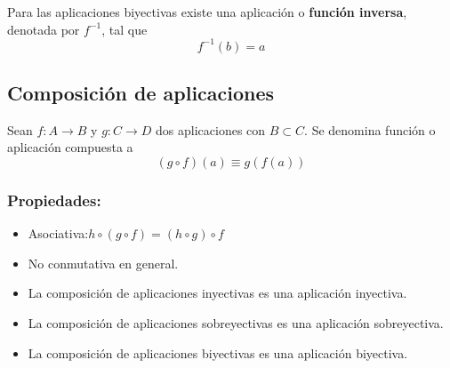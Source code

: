 \documentclass[0_algebra.tex]{subfiles}
\begin{document}
Para las aplicaciones biyectivas existe una aplicación o \textbf{función inversa}, denotada por $f^{-1}$, tal que
$$
f^{-1}(b)=a
$$

\subsection*{Composición de aplicaciones}
Sean $f:A\rightarrow B$ y $g:C \rightarrow D$ dos aplicaciones con $B \subset C$. Se denomina función o aplicación compuesta a
$$
(g\circ f)(a)\equiv g(f(a))
$$

\subsubsection*{Propiedades:}
\begin{itemize}
\item Asociativa:\quad $ h \circ (g \circ f)=(h \circ g) \circ f$
\item No conmutativa en general.
\item La composición de aplicaciones inyectivas es una aplicación inyectiva.
\item La composición de aplicaciones sobreyectivas es una aplicación sobreyectiva.
\item La composición de aplicaciones biyectivas es una aplicación biyectiva.
\end{itemize}
\end{document}
